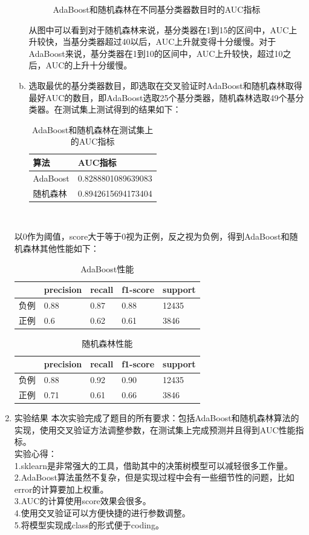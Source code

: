 \documentclass[a4paper,UTF8]{article}
\numberwithin{equation}{section}
\begin{document}
\begin{enumerate}[1.]
\begin{enumerate}[a.]
\begin{figure}[!ht]
	\caption{AdaBoost和随机森林在不同基分类器数目时的AUC指标}
	\label{fig:label}
\end{figure}
从图中可以看到对于随机森林来说，基分类器在1到15的区间中，AUC上升较快，当基分类器超过40以后，AUC上升就变得十分缓慢。对于AdaBoost来说，基分类器在1到10的区间中，AUC上升较快，超过10之后，AUC的上升十分缓慢。
\item 选取最优的基分类器数目，即选取在交叉验证时AdaBoost和随机森林取得最好AUC的数目，即AdaBoost选取25个基分类器，随机森林选取49个基分类器。在测试集上测试得到的结果如下：
\begin{table}[!ht]
	\centering
	\caption{AdaBoost和随机森林在测试集上的AUC指标}
	\label{my-label}
	\begin{tabular}{|l|l|}
		\hline
	算法	& AUC指标 \\ \hline
	AdaBoost	& 0.8288801089639083 \\ \hline
	随机森林	&  0.8942615694173404\\ \hline
	\end{tabular}
\end{table}\\
\end{enumerate}
以0作为阈值，score大于等于0视为正例，反之视为负例，得到AdaBoost和随机森林其他性能如下：
\begin{table}[!h]
	\centering
	\caption{AdaBoost性能}
	\label{my-label2}
	\begin{tabular}{|l|l|l|l|l|}
		\hline
		& precision & recall & f1-score & support \\ \hline
	负例	& 0.88 & 0.87 & 0.88 & 12435 \\ \hline
	正例	& 0.6 & 0.62 & 0.61 & 3846 \\ \hline
	\end{tabular}
\end{table}
\begin{table}[!h]
	\centering
	\caption{随机森林性能}
	\label{my-label3}
	\begin{tabular}{|l|l|l|l|l|}
		\hline
		& precision & recall & f1-score & support \\ \hline
		负例	& 0.88 & 0.92 & 0.90 & 12435 \\ \hline
		正例	& 0.71 & 0.61 & 0.66 & 3846 \\ \hline
	\end{tabular}
\end{table}
\item 实验结果
本次实验完成了题目的所有要求：包括AdaBoost和随机森林算法的实现，使用交叉验证方法调整参数，在测试集上完成预测并且得到AUC性能指标。\\
实验心得：\\
1.sklearn是非常强大的工具，借助其中的决策树模型可以减轻很多工作量。\\
2.AdaBoost算法虽然不复杂，但是实现过程中会有一些细节性的问题，比如error的计算要加上权重。\\
3.AUC的计算使用score效果会很多。\\
4.使用交叉验证可以方便快捷的进行参数调整。\\
5.将模型实现成class的形式便于coding。
\end{enumerate}
	
\end{document}
